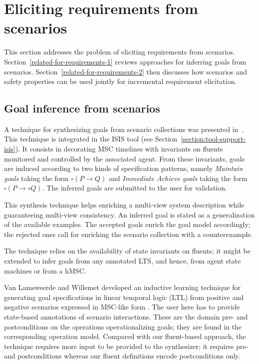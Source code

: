 \section{Eliciting requirements from scenarios\label{section:related-for-requirements}}

This section addresses the problem of eliciting requirements from scenarios. Section~\ref{related-for-requirements-1} reviews approaches for inferring goals from scenarios. Section~\ref{related-for-requirements-2} then discusses how scenarios and safety properties can be used jointly for incremental requirement elicitation. 

\subsection{Goal inference from scenarios\label{related-for-requirements-1}}

A technique for synthesizing goals from scenario collections was presented in~\cite{Damas:2006, Damas:2011}. This technique is integrated in the ISIS tool (see Section~\ref{section:tool-support-isis}). It consists in decorating MSC timelines with invariants on fluents monitored and controlled by the associated agent. From these invariants, goals are induced according to two kinds of specification patterns, namely \emph{Maintain goals} taking the form $\square(P \rightarrow Q)$ and \emph{Immediate Achieve goals} taking the form $\square(P \rightarrow \circ Q)$. The inferred goals are submitted to the user for validation.

This synthesis technique helps enriching a multi-view system description while guaranteeing multi-view consistency. An inferred goal is stated as a generalization of the available examples. The accepted goals enrich the goal model accordingly; the rejected ones call for enriching the scenario collection with a counterexample. 

The technique relies on the availability of state invariants on fluents; it might be extended to infer goals from any annotated LTS, and hence, from agent state machines or from a hMSC. 

Van Lamsweerde and Willemet developed an inductive learning technique for generating goal specifications in linear temporal logic (LTL) from positive and negative scenarios expressed in MSC-like form \cite{VanLamsweerde:1998}. The user here has to provide state-based annotations of scenario interactions. These are the domain pre- and postconditions on the operations operationalizing goals; they are found in the corresponding operation model. Compared with our fluent-based approach, the technique requires more input to be provided to the synthesizer; it requires pre- and postconditions whereas our fluent definitions encode postconditions only.

